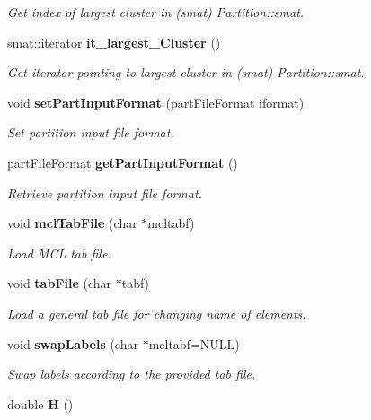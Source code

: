 \begin{CompactItemize}
\begin{CompactList}\small\item\em Get index of largest cluster in (smat) Partition::smat. \item\end{CompactList}\item 
smat::iterator {\bf it\_\-largest\_\-Cluster} ()\label{classPartition_a26}

\begin{CompactList}\small\item\em Get iterator pointing to largest cluster in (smat) Partition::smat. \item\end{CompactList}\item 
void {\bf set\-Part\-Input\-Format} (part\-File\-Format iformat)\label{classPartition_a27}

\begin{CompactList}\small\item\em Set partition input file format. \item\end{CompactList}\item 
part\-File\-Format {\bf get\-Part\-Input\-Format} ()\label{classPartition_a28}

\begin{CompactList}\small\item\em Retrieve partition input file format. \item\end{CompactList}\item 
void {\bf mcl\-Tab\-File} (char $\ast$mcltabf)\label{classPartition_a29}

\begin{CompactList}\small\item\em Load MCL tab file. \item\end{CompactList}\item 
void {\bf tab\-File} (char $\ast$tabf)\label{classPartition_a30}

\begin{CompactList}\small\item\em Load a general tab file for changing name of elements. \item\end{CompactList}\item 
void {\bf swap\-Labels} (char $\ast$mcltabf=NULL)\label{classPartition_a31}

\begin{CompactList}\small\item\em Swap labels according to the provided tab file. \item\end{CompactList}\item 
double {\bf H} ()\label{classPartition_a32}


\end{CompactItemize}
